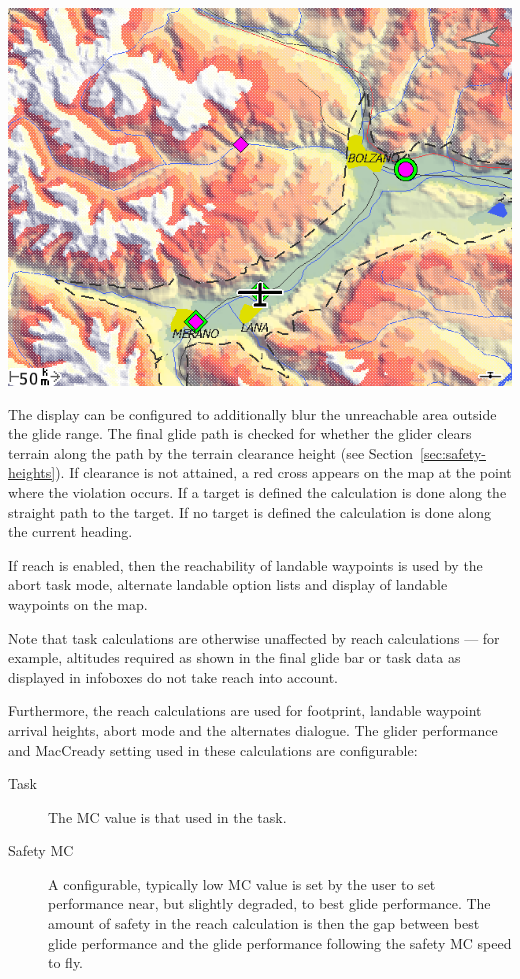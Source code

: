\begin{description}
\begin{center}
\includegraphics[angle=0,width=0.8\linewidth,keepaspectratio='true']{figures/reach2.png}
\end{center}

\end{description}

The display can be configured to additionally blur the unreachable area
outside the glide range. 
The final glide path is checked for whether the glider clears terrain along
the path by the terrain clearance height (see Section~\ref{sec:safety-heights}).
If clearance is not attained, a red
cross appears on the map at the point where the violation occurs. If a target is
defined the calculation is done along the straight path to the target. If no 
target is defined the calculation is done along the current heading.

If reach is enabled, then the reachability of landable waypoints is used
by the abort task mode, alternate landable option lists and display of
landable waypoints on the map.

Note that task calculations are otherwise unaffected by reach
calculations --- for example, altitudes required as shown in the final
glide bar or task data as displayed in infoboxes do not take reach into account.

Furthermore, the reach calculations are used for footprint, landable
waypoint arrival heights, abort mode and the alternates dialogue.  The glider
performance and MacCready setting used in these calculations are configurable:
\begin{description}
\item[Task] The MC value is that used in the task.
\item[Safety MC] A configurable, typically low MC value is set by the user to set
  performance near, but slightly degraded, to best glide performance. The amount of safety 
  in the reach calculation is then the gap between best glide performance and the glide
  performance following the safety MC speed to fly. 
\end{description}

